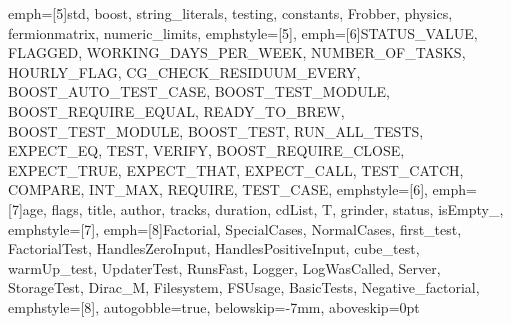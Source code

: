 {emph=[5]{std, boost, string_literals, testing, constants, Frobber, physics, fermionmatrix, numeric_limits},
emphstyle=[5]{\color{Maroon}}, %
emph=[6]{STATUS_VALUE, FLAGGED, WORKING_DAYS_PER_WEEK, NUMBER_OF_TASKS, HOURLY_FLAG,
         CG_CHECK_RESIDUUM_EVERY, BOOST_AUTO_TEST_CASE, BOOST_TEST_MODULE, BOOST_REQUIRE_EQUAL,
         READY_TO_BREW, BOOST_TEST_MODULE, BOOST_TEST, RUN_ALL_TESTS, EXPECT_EQ, TEST, VERIFY,
         BOOST_REQUIRE_CLOSE, EXPECT_TRUE, EXPECT_THAT, EXPECT_CALL, TEST_CATCH, COMPARE, INT_MAX,
         REQUIRE, TEST_CASE},
emphstyle=[6]{\color{Gray}}, %
emph=[7]{age, flags, title, author, tracks, duration, cdList, T, grinder, status, isEmpty_},
emphstyle=[7]{\color{Peach!50!Purple}}, %
emph=[8]{Factorial, SpecialCases, NormalCases, first_test, FactorialTest, HandlesZeroInput,
         HandlesPositiveInput, cube_test, warmUp_test, UpdaterTest, RunsFast, Logger, LogWasCalled,
         Server, StorageTest, Dirac_M, Filesystem, FSUsage, BasicTests, Negative_factorial},
emphstyle=[8]{\color{Blue}}, %
autogobble=true, %
belowskip=-7mm,
aboveskip=0pt
}

